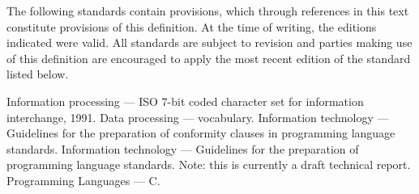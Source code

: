 %
\begin{optDefinition}
The following standards contain provisions, which through references
in this text constitute provisions of this definition.  At the
time of writing, the editions indicated were valid.  All standards are
subject to revision and parties making use of this definition are
encouraged to apply the most recent edition of the standard listed
below.
\begin{references}
     Information processing --- ISO 7-bit coded
    character set for information interchange, 1991.
     Data processing --- vocabulary.
     Information technology ---
    Guidelines for the preparation of conformity clauses in programming language
    standards.
     Information technology ---
    Guidelines for the preparation of programming language standards. Note: this
    is currently a draft technical report.
     Programming Languages --- C.
\end{references}
\end{optDefinition}
%
\label{subsubsec:cse}
